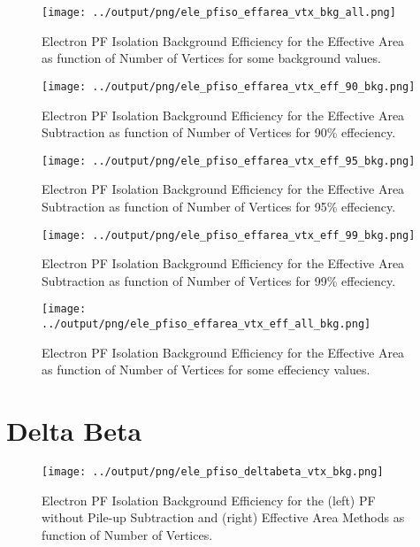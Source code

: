 \documentclass[11pt]{book}
\begin{document}
\begin{figure}[htb]
\centering
\texttt{[image: ../output/png/ele\_pfiso\_effarea\_vtx\_bkg\_all.png]}
\caption{Electron PF Isolation Background Efficiency for the Effective Area as function of Number of Vertices for some background values.}
\label{fig:ele_pfiso_vtx_bkg_effarea_bkg_all}
\end{figure}

\begin{figure}[htb]
\centering
\texttt{[image: ../output/png/ele\_pfiso\_effarea\_vtx\_eff\_90\_bkg.png]}
\caption{Electron PF Isolation Background Efficiency for the Effective Area Subtraction as function of Number of Vertices for 90\% effeciency.}
\label{fig:ele_pfiso_vtx_eff_effarea_eff_90_bkg}
\end{figure}

\begin{figure}[htb]
\centering
\texttt{[image: ../output/png/ele\_pfiso\_effarea\_vtx\_eff\_95\_bkg.png]}
\caption{Electron PF Isolation Background Efficiency for the Effective Area Subtraction as function of Number of Vertices for 95\% effeciency.}
\label{fig:ele_pfiso_vtx_eff_effarea_eff_95_bkg}
\end{figure}

\begin{figure}[htb]
\centering
\texttt{[image: ../output/png/ele\_pfiso\_effarea\_vtx\_eff\_99\_bkg.png]}
\caption{Electron PF Isolation Background Efficiency for the Effective Area Subtraction as function of Number of Vertices for 99\% effeciency.}
\label{fig:ele_pfiso_vtx_eff_effarea_eff_99_bkg}
\end{figure}

\begin{figure}[htb]
\centering
\texttt{[image: ../output/png/ele\_pfiso\_effarea\_vtx\_eff\_all\_bkg.png]}
\caption{Electron PF Isolation Background Efficiency for the Effective Area as function of Number of Vertices for some effeciency values.}
\label{fig:ele_pfiso_vtx_eff_effarea_eff_all_bkg}
\end{figure}
\clearpage

\section{Delta Beta}
\begin{figure}[htb]
\centering
\texttt{[image: ../output/png/ele\_pfiso\_deltabeta\_vtx\_bkg.png]}
\caption{Electron PF Isolation Background Efficiency for the (left) PF without Pile-up Subtraction and (right) Effective Area Methods as function of Number of Vertices.}
\label{fig:ele_pfiso_vtx_bkg_deltabeta}
\end{figure}
\end{document}
